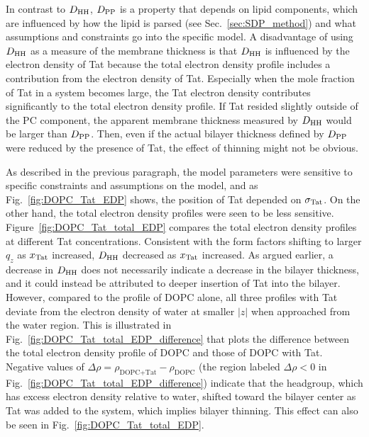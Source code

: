 In contrast to $D_\textrm{HH}$, $D_\textrm{PP}$ is a property that
depends on lipid components, which are influenced by how the lipid is parsed 
(see Sec.~\ref{sec:SDP_method})
and what assumptions and constraints go into the specific model.
A disadvantage of using $D_\textrm{HH}$ as a measure of the membrane thickness is
that $D_\textrm{HH}$ is influenced by the electron density of Tat because 
the total electron density profile includes a contribution from the electron density of Tat. 
Especially when the mole fraction of Tat in a system becomes large, 
the Tat electron density contributes significantly to the total electron 
density profile. If Tat resided slightly 
outside of the PC component, the apparent membrane thickness measured by $D_\textrm{HH}$
would be larger than $D_\textrm{PP}$. Then, even if the actual bilayer thickness defined by $D_\textrm{PP}$ 
were reduced by the presence of Tat, the effect of thinning might not be obvious. 

As described in the previous paragraph, the model parameters were sensitive to 
specific constraints and assumptions on the model, and as Fig.~\ref{fig:DOPC_Tat_EDP}
shows, the position of Tat depended on $\sigma_\textrm{Tat}$. On the other hand,
the total electron density profiles were seen to be less sensitive. 
Figure~\ref{fig:DOPC_Tat_total_EDP} compares the total electron density profiles
at different Tat concentrations. Consistent with the form factors shifting 
to larger $q_z$ as $x_\textrm{Tat}$ increased, $D_\textrm{HH}$ decreased as $x_\textrm{Tat}$ increased.
As argued earlier, a decrease in $D_\textrm{HH}$ does not necessarily indicate a decrease
in the bilayer thickness, and it could instead be attributed to deeper insertion
of Tat into the bilayer. However, compared to the profile of DOPC alone,
all three profiles with Tat deviate from the electron density of water 
at smaller $|z|$ when approached from the water region. This is illustrated 
in Fig.~\ref{fig:DOPC_Tat_total_EDP_difference} that plots the difference 
between the total electron density profile of DOPC and those of DOPC with Tat.
Negative values of $\Delta\rho = \rho_\text{DOPC+Tat} - \rho_\text{DOPC}$
(the region labeled $\Delta\rho < 0$ in Fig.~\ref{fig:DOPC_Tat_total_EDP_difference})
indicate that the headgroup, which has excess electron density relative to
water, shifted toward the bilayer center as Tat was added to the system,
which implies bilayer thinning. This effect can also be seen in 
Fig.~\ref{fig:DOPC_Tat_total_EDP}.

